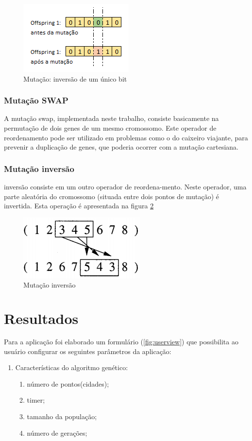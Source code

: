 \documentclass[twoside]{article}
\begin{document}
\begin{multicols}{2}
\begin{figure}[H]
\label{fig:mut}
  \caption{Mutação: inversão de um único bit}
  \centering
    \includegraphics[scale = 0.9]{mutation.png}
\end{figure}

\subsubsection{Mutação SWAP}
A mutação swap, implementada neste trabalho, consiste basicamente na permutação de dois genes de um mesmo cromossomo. Este operador de reordenamento pode ser utilizado em problemas como o do caixeiro viajante, para prevenir a duplicação de genes, que poderia ocorrer com a mutação cartesiana.

\subsubsection{Mutação inversão}
 inversão consiste em um outro operador de reordena-mento. Neste operador, uma parte aleatória do cromossomo (situada entre dois pontos de mutação) é invertida. Esta operação é apresentada na figura \ref{fig:mutinv}

\begin{figure}[H]
\label{fig:mutinv}
  \caption{Mutação inversão}
  \centering
    \includegraphics[scale = 0.7]{mutation_inversion.png}
\end{figure}


\section{Resultados}
Para a aplicação foi elaborado um formulário (\ref {fig:userview}) que possibilita ao usuário configurar os seguintes parâmetros da aplicação:
\begin{enumerate}
\item Características do algoritmo genético:
\begin{enumerate}
\item número de pontos(cidades);
\item timer;
\item tamanho da população;
\item número de gerações;
\end{enumerate}


\end{enumerate}
\end{multicols}
\end{document}

